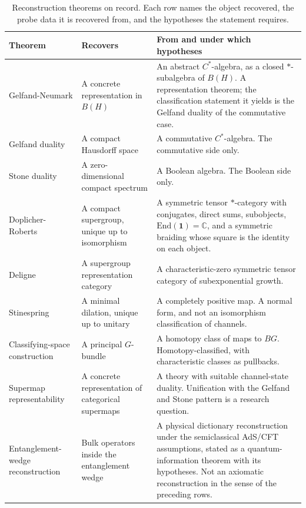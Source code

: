 \documentclass[11pt,letterpaper]{article}
\theoremstyle{definition}
\theoremstyle{remark}
\begin{document}
\begin{table}[t]
\centering
\small
\caption{Reconstruction theorems on record. Each row names the object recovered, the probe data it is recovered from, and the hypotheses the statement requires.}
\label{tab:reconstruction}
\begin{tabularx}{\textwidth}{Y{0.90}Y{1.05}Y{1.05}}
\toprule
Theorem & Recovers & From and under which hypotheses \\
\midrule
Gelfand-Neumark \cite{corpus-42} & A concrete representation in $B(H)$ & An abstract $C^*$-algebra, as a closed $*$-subalgebra of $B(H)$. A representation theorem; the classification statement it yields is the Gelfand duality of the commutative case. \\
Gelfand duality \cite{corpus-43} & A compact Hausdorff space & A commutative $C^*$-algebra. The commutative side only. \\
Stone duality \cite{corpus-44} & A zero-dimensional compact spectrum & A Boolean algebra. The Boolean side only. \\
Doplicher-Roberts \cite{corpus-12,corpus-67} & A compact supergroup, unique up to isomorphism & A symmetric tensor $*$-category with conjugates, direct sums, subobjects, $\mathrm{End}(\mathbf{1})=\mathbb{C}$, and a symmetric braiding whose square is the identity on each object. \\
Deligne \cite{corpus-13} & A supergroup representation category & A characteristic-zero symmetric tensor category of subexponential growth. \\
Stinespring \cite{corpus-10} & A minimal dilation, unique up to unitary & A completely positive map. A normal form, and not an isomorphism classification of channels. \\
Classifying-space construction \cite{corpus-17,corpus-18} & A principal $G$-bundle & A homotopy class of maps to $BG$. Homotopy-classified, with characteristic classes as pullbacks. \\
Supermap representability \cite{corpus-40,corpus-41} & A concrete representation of categorical supermaps & A theory with suitable channel-state duality. Unification with the Gelfand and Stone pattern is a research question. \\
Entanglement-wedge reconstruction \cite{corpus-46} & Bulk operators inside the entanglement wedge & A physical dictionary reconstruction under the semiclassical AdS/CFT assumptions, stated as a quantum-information theorem with its hypotheses. Not an axiomatic reconstruction in the sense of the preceding rows. \\
\bottomrule
\end{tabularx}
\end{table}
\end{document}
